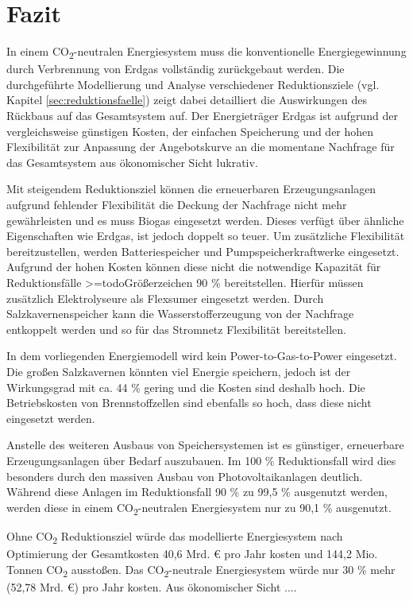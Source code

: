 \section{Fazit}
In einem CO\textsubscript{2}-neutralen Energiesystem muss die konventionelle Energiegewinnung durch Verbrennung von Erdgas vollständig zurückgebaut werden. Die durchgeführte Modellierung und Analyse verschiedener Reduktionsziele (vgl. Kapitel \ref{sec:reduktionsfaelle}) zeigt dabei detailliert die Auswirkungen des Rückbaus auf das Gesamtsystem auf.
Der Energieträger Erdgas ist aufgrund der vergleichsweise günstigen Kosten, der einfachen Speicherung und der hohen Flexibilität zur Anpassung der Angebotskurve an die momentane Nachfrage für das Gesamtsystem aus ökonomischer Sicht lukrativ. 

Mit steigendem Reduktionsziel können die erneuerbaren Erzeugungsanlagen aufgrund fehlender Flexibilität die Deckung der Nachfrage nicht mehr gewährleisten und es muss Biogas eingesetzt werden. Dieses verfügt über ähnliche Eigenschaften wie Erdgas, ist jedoch doppelt so teuer. Um zusätzliche Flexibilität bereitzustellen, werden Batteriespeicher und Pumpspeicherkraftwerke eingesetzt. Aufgrund der hohen Kosten können diese nicht die notwendige Kapazität für Reduktionsfälle >=todo{Größerzeichen} 90 \% bereitstellen.
Hierfür müssen zusätzlich Elektrolyseure als Flexsumer eingesetzt werden. Durch Salzkavernenspeicher kann die Wasserstofferzeugung von der Nachfrage entkoppelt werden und so für das Stromnetz Flex\-ibilität bereitstellen.  

In dem vorliegenden Energiemodell wird kein Power-to-Gas-to-Power eingesetzt. Die großen Salzkavernen könnten viel Energie speichern, jedoch ist der Wirkungsgrad mit ca. 44 \% gering und die Kosten sind deshalb hoch. Die Betriebskosten von Brennstoffzellen sind ebenfalls so hoch, dass diese nicht eingesetzt werden. 

Anstelle des weiteren Ausbaus von Speichersystemen ist es günstiger, erneuerbare Erzeugungsanlagen über Bedarf auszubauen. Im 100 \% Reduktionsfall wird dies besonders durch den massiven Ausbau von Photovoltaikanlagen deutlich. Während diese Anlagen im Reduktionsfall 90 \% zu 99,5 \% ausgenutzt werden, werden diese in einem CO\textsubscript{2}-neutralen Energiesystem nur zu 90,1 \% ausgenutzt.  

Ohne CO\textsubscript{2} Reduktionsziel würde das modellierte Energiesystem nach Optimierung der Gesamtkosten 40,6 Mrd. € pro Jahr kosten und 144,2 Mio. Tonnen CO\textsubscript{2} ausstoßen. Das CO\textsubscript{2}-neutrale Energiesystem würde nur 30 \% mehr (52,78 Mrd. €) pro Jahr kosten. Aus ökonomischer Sicht .... 

